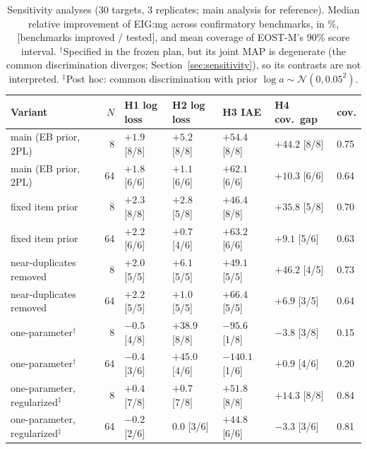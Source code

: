 \begin{table}[tbp]
\centering\footnotesize
\caption{Sensitivity analyses (30 targets, 3 replicates; main analysis for reference). Median relative improvement of EIG:mg across confirmatory benchmarks, in \%, [benchmarks improved / tested], and mean coverage of EOST-M's 90\% score interval. $^{\dagger}$Specified in the frozen plan, but its joint MAP is degenerate (the common discrimination diverges; Section~\ref{sec:sensitivity}), so its contrasts are not interpreted. $^{\ddagger}$Post hoc: common discrimination with prior $\log a\sim\mathcal N(0,0.05^2)$.}
\label{tab:sens}
\setlength{\tabcolsep}{3.5pt}
\begin{tabular}{@{}lrlllll@{}}
\toprule
Variant & $N$ & H1 log loss & H2 log loss & H3 IAE & H4 cov.\ gap & cov. \\
\midrule
main (EB prior, 2PL) & 8 & $+1.9$ [8/8] & $+5.2$ [8/8] & $+54.4$ [8/8] & $+44.2$ [8/8] & 0.75 \\
main (EB prior, 2PL) & 64 & $+1.8$ [6/6] & $+1.1$ [6/6] & $+62.1$ [6/6] & $+10.3$ [6/6] & 0.64 \\
fixed item prior & 8 & $+2.3$ [8/8] & $+2.8$ [5/8] & $+46.4$ [8/8] & $+35.8$ [5/8] & 0.70 \\
fixed item prior & 64 & $+2.2$ [6/6] & $+0.7$ [4/6] & $+63.2$ [6/6] & $+9.1$ [5/6] & 0.63 \\
near-duplicates removed & 8 & $+2.0$ [5/5] & $+6.1$ [5/5] & $+49.1$ [5/5] & $+46.2$ [4/5] & 0.73 \\
near-duplicates removed & 64 & $+2.2$ [5/5] & $+1.0$ [5/5] & $+66.4$ [5/5] & $+6.9$ [3/5] & 0.64 \\
\midrule
one-parameter$^{\dagger}$ & 8 & $-0.5$ [4/8] & $+38.9$ [8/8] & $-95.6$ [1/8] & $-3.8$ [3/8] & 0.15 \\
one-parameter$^{\dagger}$ & 64 & $-0.4$ [3/6] & $+45.0$ [4/6] & $-140.1$ [1/6] & $+0.9$ [4/6] & 0.20 \\
\midrule
one-parameter, regularized$^{\ddagger}$ & 8 & $+0.4$ [7/8] & $+0.7$ [7/8] & $+51.8$ [8/8] & $+14.3$ [8/8] & 0.84 \\
one-parameter, regularized$^{\ddagger}$ & 64 & $-0.2$ [2/6] & $0.0$ [3/6] & $+44.8$ [6/6] & $-3.3$ [3/6] & 0.81 \\
\bottomrule
\end{tabular}
\end{table}
